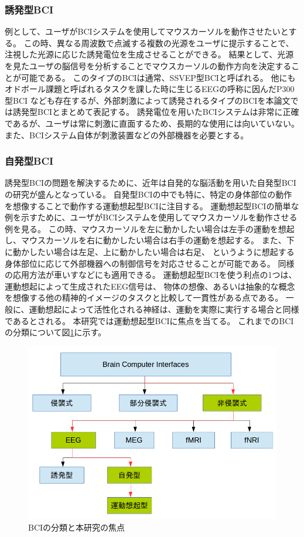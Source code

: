 \subsubsection{誘発型BCI}
例として、ユーザがBCIシステムを使用してマウスカーソルを動作させたいとする。 
この時、異なる周波数で点滅する複数の光源をユーザに提示することで、
注視した光源に応じた誘発電位を生成させることができる。
結果として、光源を見たユーザの脳信号を分析することでマウスカーソルの動作方向を決定することが可能である。
このタイプのBCIは通常、SSVEP型BCIと呼ばれる。
他にもオドボール課題と呼ばれるタスクを課した時に生じるEEGの呼称に因んだP300型BCI
なども存在するが、外部刺激によって誘発されるタイプのBCIを本論文では誘発型BCIとまとめて表記する。
誘発電位を用いたBCIシステムは非常に正確であるが、ユーザは常に刺激に直面するため、長期的な使用には向いていない。
また、BCIシステム自体が刺激装置などの外部機器を必要とする。
\subsubsection{自発型BCI}
誘発型BCIの問題を解決するために、近年は自発的な脳活動を用いた自発型BCIの研究が盛んとなっている。
自発型BCIの中でも特に、特定の身体部位の動作を想像することで動作する運動想起型BCIに注目する。
運動想起型BCIの簡単な例を示すために、ユーザがBCIシステムを使用してマウスカーソルを動作させる例を見る。
この時、マウスカーソルを左に動かしたい場合は左手の運動を想起し、マウスカーソルを右に動かしたい場合は右手の運動を想起する。
また、下に動かしたい場合は左足、上に動かしたい場合は右足、
というように想起する身体部位に応じて外部機器への制御信号を対応させることが可能である。
同様の応用方法が車いすなどにも適用できる。
運動想起型BCIを使う利点の1つは、運動想起によって生成されたEEG信号は、
物体の想像、あるいは抽象的な概念を想像する他の精神的イメージのタスクと比較して一貫性がある点である。
一般に、運動想起によって活性化される神経は、運動を実際に実行する場合と同様であるとされる\cite{運動想起}。
本研究では運動想起型BCIに焦点を当てる。
これまでのBCIの分類について図\ref{fig:BCIclass}に示す。

\begin{figure}[tb]
    \centering
    \includegraphics[width=14cm]{images/BCIclass.png}
    \caption{BCIの分類と本研究の焦点}
    \label{fig:BCIclass}
\end{figure}

